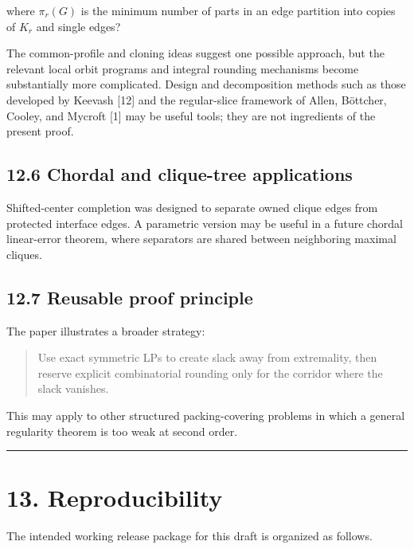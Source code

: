 \documentclass[
  11pt,
]{article}
\begin{document}
where \(\pi_r(G)\) is the minimum number of parts in an edge partition
into copies of \(K_r\) and single edges?

The common-profile and cloning ideas suggest one possible approach, but
the relevant local orbit programs and integral rounding mechanisms
become substantially more complicated. Design and decomposition methods
such as those developed by Keevash {[}12{]} and the regular-slice
framework of Allen, Böttcher, Cooley, and Mycroft {[}1{]} may be useful
tools; they are not ingredients of the present proof.

\subsection{12.6 Chordal and clique-tree
applications}\label{chordal-and-clique-tree-applications}

Shifted-center completion was designed to separate owned clique edges
from protected interface edges. A parametric version may be useful in a
future chordal linear-error theorem, where separators are shared between
neighboring maximal cliques.

\subsection{12.7 Reusable proof
principle}\label{reusable-proof-principle}

The paper illustrates a broader strategy:

\begin{quote}
Use exact symmetric LPs to create slack away from extremality, then
reserve explicit combinatorial rounding only for the corridor where the
slack vanishes.
\end{quote}

This may apply to other structured packing-covering problems in which a
general regularity theorem is too weak at second order.

\begin{center}\rule{0.5\linewidth}{0.5pt}\end{center}

\section{13. Reproducibility}\label{reproducibility}

The intended working release package for this draft is organized as
follows.
\end{document}
